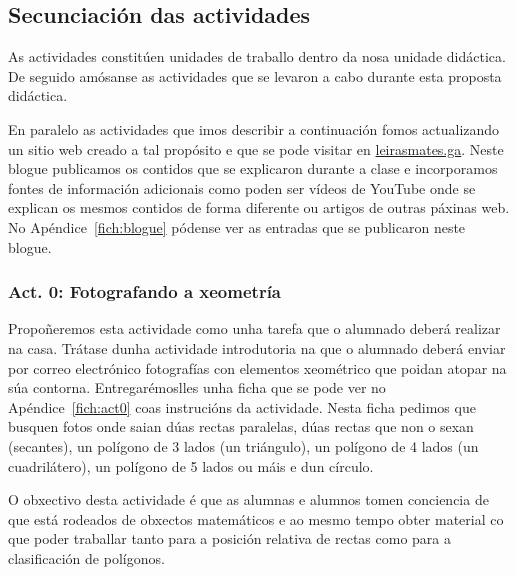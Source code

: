 \subsection{Secunciación das actividades}

As actividades constitúen unidades de traballo dentro da nosa unidade didáctica. De seguido amósanse as actividades que se levaron a cabo durante esta proposta didáctica.

En paralelo as actividades que imos describir a continuación fomos actualizando un sitio web creado a tal propósito e que se pode visitar en \href{http://leirasmates.ga}{leirasmates.ga}. Neste blogue publicamos os contidos que se explicaron durante a clase e incorporamos fontes de información adicionais como poden ser vídeos de YouTube onde se explican os mesmos contidos de forma diferente ou artigos de outras páxinas web. No Apéndice~\ref{fich:blogue} pódense ver as entradas que se publicaron neste blogue.

\subsubsection{Act. 0: Fotografando a xeometría}\label{act0}

Propoñeremos esta actividade como unha tarefa que o alumnado deberá realizar na casa. Trátase dunha actividade introdutoria na que o alumnado deberá enviar por correo electrónico fotografías con elementos xeométrico que poidan atopar na súa contorna. Entregarémoslles unha ficha que se pode ver no  Apéndice~\ref{fich:act0} coas instrucións da actividade. Nesta ficha pedimos que busquen fotos onde saian dúas rectas paralelas, dúas rectas que non o sexan (secantes), un polígono de 3 lados (un triángulo), un polígono de 4 lados (un cuadrilátero), un polígono de 5 lados ou máis e dun círculo.

O obxectivo desta actividade é que as alumnas e alumnos tomen conciencia de que está rodeados de obxectos matemáticos e ao mesmo tempo obter material co que poder traballar tanto para a posición relativa de rectas como para a clasificación de polígonos.


